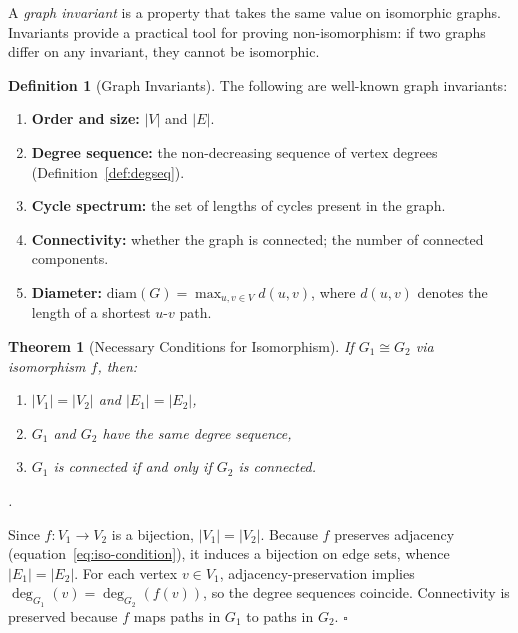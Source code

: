 \documentclass[12pt,a4paper]{article}
\theoremstyle{definition}
\newtheorem{definition}{Definition}[section]
\theoremstyle{plain}
\newtheorem{theorem}{Theorem}[section]
\renewenvironment{proof}[1][\proofname]{%
  \par\noindent\textit{#1.}\enspace\ignorespaces
}{%
  \hfill$\square$\par\medskip
}
\begin{document}
A \emph{graph invariant} is a property that takes the same value on
isomorphic graphs.  Invariants provide a practical tool for proving
non-isomorphism: if two graphs differ on any invariant, they cannot be
isomorphic.

\begin{definition}[Graph Invariants]\label{def:invariants}
  The following are well-known graph invariants:
  \begin{enumerate}
    \item \textbf{Order and size:} \(|V|\) and \(|E|\).
    \item \textbf{Degree sequence:} the non-decreasing sequence of vertex
          degrees (Definition~\ref{def:degseq}).
    \item \textbf{Cycle spectrum:} the set of lengths of cycles present in
          the graph.
    \item \textbf{Connectivity:} whether the graph is connected; the number
          of connected components.
    \item \textbf{Diameter:} \(\mathrm{diam}(G) = \max_{u,v \in V} d(u,v)\),
          where \(d(u,v)\) denotes the length of a shortest \(u\)-\(v\) path.
  \end{enumerate}
\end{definition}

\begin{theorem}[Necessary Conditions for Isomorphism]\label{thm:iso-necessary}
  If \(G_1 \cong G_2\) via isomorphism \(f\), then:
  \begin{enumerate}
    \item \(|V_1| = |V_2|\) and \(|E_1| = |E_2|\),
    \item \(G_1\) and \(G_2\) have the same degree sequence,
    \item \(G_1\) is connected if and only if \(G_2\) is connected.
  \end{enumerate}
\end{theorem}

\begin{proof}
  Since \(f: V_1 \to V_2\) is a bijection, \(|V_1| = |V_2|\).  Because
  \(f\) preserves adjacency (equation~\eqref{eq:iso-condition}), it
  induces a bijection on edge sets, whence \(|E_1| = |E_2|\).  For
  each vertex \(v \in V_1\), adjacency-preservation implies
  \(\deg_{G_1}(v) = \deg_{G_2}(f(v))\), so the degree sequences coincide.
  Connectivity is preserved because \(f\) maps paths in \(G_1\) to paths
  in \(G_2\).
\end{proof}
\end{document}
